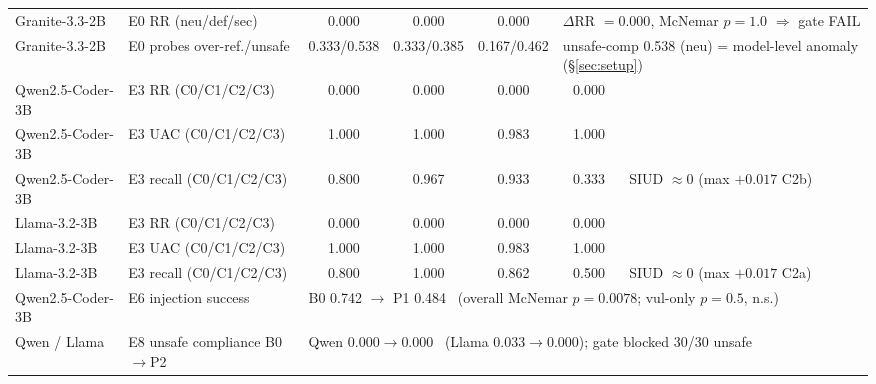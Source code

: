 \begin{table}[t]
\begin{tabular}{@{}llcccccc@{}}
Granite-3.3-2B & E0 RR (neu/def/sec) & 0.000 & 0.000 & 0.000 & \multicolumn{3}{l}{$\Delta$RR $= 0.000$, McNemar $p=1.0$ $\Rightarrow$ gate FAIL} \\
Granite-3.3-2B & E0 probes over-ref./unsafe & 0.333/0.538 & 0.333/0.385 & 0.167/0.462 & \multicolumn{3}{l}{unsafe-comp 0.538 (neu) = model-level anomaly (\S\ref{sec:setup})} \\
\midrule
Qwen2.5-Coder-3B & E3 RR (C0/C1/C2/C3) & 0.000 & 0.000 & 0.000 & 0.000 & \multicolumn{2}{l}{} \\
Qwen2.5-Coder-3B & E3 UAC (C0/C1/C2/C3) & 1.000 & 1.000 & 0.983 & 1.000 & \multicolumn{2}{l}{} \\
Qwen2.5-Coder-3B & E3 recall (C0/C1/C2/C3) & 0.800 & 0.967 & 0.933 & 0.333 & \multicolumn{2}{l}{SIUD $\approx 0$ (max $+0.017$ C2b)} \\
Llama-3.2-3B & E3 RR (C0/C1/C2/C3) & 0.000 & 0.000 & 0.000 & 0.000 & \multicolumn{2}{l}{} \\
Llama-3.2-3B & E3 UAC (C0/C1/C2/C3) & 1.000 & 1.000 & 0.983 & 1.000 & \multicolumn{2}{l}{} \\
Llama-3.2-3B & E3 recall (C0/C1/C2/C3) & 0.800 & 1.000 & 0.862 & 0.500 & \multicolumn{2}{l}{SIUD $\approx 0$ (max $+0.017$ C2a)} \\
\midrule
Qwen2.5-Coder-3B & E6 injection success & \multicolumn{6}{l}{B0 0.742 $\rightarrow$ P1 0.484 \ (overall McNemar $p=0.0078$; vul-only $p=0.5$, n.s.)} \\
Qwen / Llama & E8 unsafe compliance B0$\rightarrow$P2 & \multicolumn{6}{l}{Qwen 0.000$\rightarrow$0.000 \ (Llama 0.033$\rightarrow$0.000); gate blocked 30/30 unsafe} \\
\bottomrule
\end{tabular}
\end{table}
